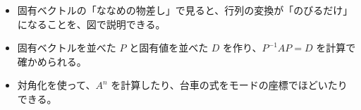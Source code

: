 \newcommand\kviijwall[3]{\begin{scope}[shift={#1}]
  \draw[bkInk, line width=0.9pt] (0,0) -- (0,#2);
  \foreach \kviijy in {0,2.5,...,#2} {\draw[bkInk!60, line width=0.4pt] (0,\kviijy) -- ({-1.6*#3},{\kviijy+1.6});}
\end{scope}}
\newcommand\kviijpanel[6]{\begin{scope}[shift={#1}]
  \draw[bkLine, line width=0.5pt] (-4,0) -- (17,0) (0,-6) -- (0,16);
  \draw[bkGray, line width=0.4pt, dash pattern=on 1pt off 1pt] (0,0) circle (6.5);
  \draw[bkGray!80!black, line width=1.2pt, -{Stealth[length=2.2mm]}] (0,0) -- ({6.5*#2},{6.5*#3});
  \draw[bkOrange!85!black, line width=1.4pt, -{Stealth[length=2.6mm]}] (0,0) -- ({6.5*#4},{6.5*#5});
  \node[font=\sffamily\footnotesize, align=center, anchor=north] at (6,-7.5) {#6};
\end{scope}}
\makeatother



\begin{goal}
\begin{itemize}[label={\color{\bkTT}●}, leftmargin=1.6\zw, itemsep=0pt, topsep=1pt]
\item {}\enspace 固有ベクトルの「ななめの物差し」で見ると、行列の変換が「のびるだけ」になることを、図で説明できる。
\item {}\enspace 固有ベクトルを並べた $P$ と固有値を並べた $D$ を作り、$P^{-1}AP=D$ を計算で確かめられる。
\item {}\enspace 対角化を使って、$A^n$ を計算したり、台車の式をモードの座標でほどいたりできる。
\end{itemize}
\end{goal}

